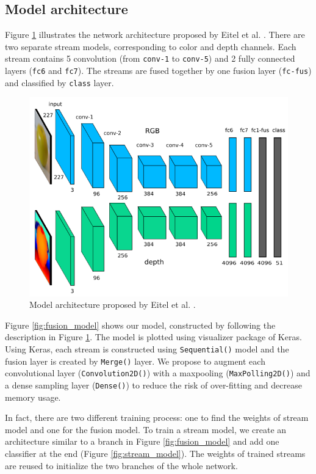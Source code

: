 \documentclass[paper=letter, fontsize=12pt]{article}
\begin{document}
\subsection{Model architecture}
Figure \ref{fig:architecture_eitel} illustrates the network architecture proposed by Eitel et al. \cite{Eitel2015}. There are two separate stream models, corresponding to color and depth channels. Each stream contains 5 convolution (from \texttt{conv-1} to \texttt{conv-5}) and 2 fully connected layers (\texttt{fc6} and \texttt{fc7}). The streams are fused together by one fusion layer (\texttt{fc-fus}) and classified by \texttt{class} layer.
\begin{figure}[htbp]
	\centering
	\includegraphics[width=.7\textwidth]{architecture}
	\caption{Model architecture proposed by Eitel et al. \cite{Eitel2015}.}
	\label{fig:architecture_eitel}
\end{figure}

Figure \ref{fig:fusion_model} shows our model, constructed by following the description in Figure \ref{fig:architecture_eitel}. The model is plotted using visualizer package of Keras. Using Keras, each stream is constructed using \texttt{Sequential()} model and the fusion layer is created by \texttt{Merge()} layer. We propose to augment each convolutional layer (\texttt{Convolution2D()}) with a maxpooling (\texttt{MaxPolling2D()}) and a dense sampling layer (\texttt{Dense()}) to reduce the risk of over-fitting and decrease memory usage.

In fact, there are two different training process: one to find the weights of stream model and one for the fusion model. To train a stream model, we create an architecture similar to a branch in Figure \ref{fig:fusion_model} and add one classifier at the end (Figure \ref{fig:stream_model}). The weights of trained streams are reused to initialize the two branches of the whole network.
\end{document}
